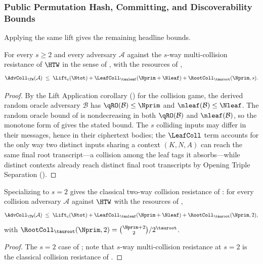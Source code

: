 \subsubsection{Public Permutation Hash, Committing, and Discoverability Bounds}

Applying the same lift gives the remaining headline bounds.

\begin{theorem}
\label{thm:coll}
For every $s \geq 2$ and every adversary $\mathcal{A}$ against the $s$-way
multi-collision resistance of $\HTW$ in the sense of \cite{BH22}, with the
resources of ,
\[
  \AdvColl_\TW(\mathcal{A})
  \;\leq\;
  \Lift_c(\Ntot)
  + \LeafColl_{\tauleaf}(\Nprim+\Nleaf)
  + \RootColl_{\tauroot}(\Nprim, s).
\]
\end{theorem}

\begin{proof}
By the Lift Application corollary () for the
collision game, the derived random oracle adversary $\mathcal{B}$ has
$\qRO(\mathcal{B}) \leq \Nprim$ and $\nleaf(\mathcal{B}) \leq \Nleaf$. The
random oracle bound of  is nondecreasing in both
$\qRO(\mathcal{B})$ and $\nleaf(\mathcal{B})$, so the monotone form of
 gives the stated bound. The $s$ colliding
inputs may differ in their messages, hence in their ciphertext bodies; the
$\LeafColl$ term accounts for the only way two distinct inputs sharing a
context $(K, N, A)$ can reach the same final root transcript---a collision
among the leaf tags it absorbs---while distinct contexts already reach
distinct final root transcripts by Opening Triple Separation
().
\end{proof}

\begin{corollary}
\label{cor:coll-rs04}
Specializing  to $s = 2$ gives the classical two-way
collision resistance of \cite{RS04}: for every collision adversary
$\mathcal{A}$ against $\HTW$ with the resources of ,
\[
  \AdvColl_\TW(\mathcal{A})
  \;\leq\;
  \Lift_c(\Ntot)
  + \LeafColl_{\tauleaf}(\Nprim+\Nleaf)
  + \RootColl_{\tauroot}(\Nprim, 2),
\]
with $\RootColl_{\tauroot}(\Nprim, 2) = \binom{\Nprim + 2}{2} / 2^{\tauroot}$.
\end{corollary}

\begin{proof}
The $s = 2$ case of ; \cite{BH22} note that $s$-way
multi-collision resistance at $s = 2$ is the classical collision resistance
of \cite{RS04}.
\end{proof}

